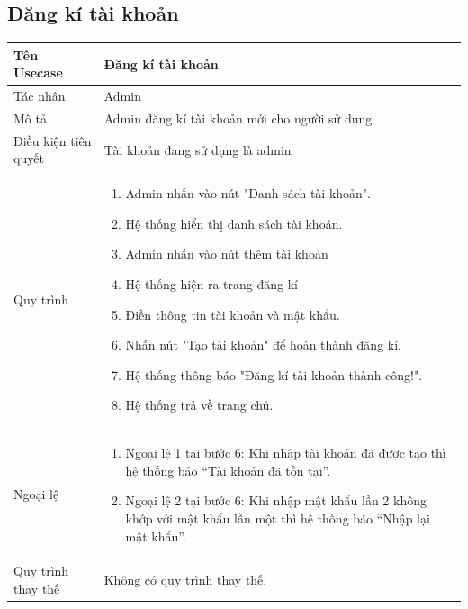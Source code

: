 \subsection{Đăng kí tài khoản }
\begin{center}
	\begin{tabular}{|p{4cm}|p{10cm}|}
		\hline
		Tên Usecase & Đăng kí tài khoản\\ \hline
		Tác nhân & Admin\\ \hline
		Mô tả & Admin đăng kí tài khoản mới cho người sử dụng
		\\ \hline
		Điều kiện tiên quyết & Tài khoản đang sử dụng là admin \\ \hline
		Quy trình & \begin{enumerate}
			\item Admin nhấn vào nút "Danh sách tài khoản".
			\item Hệ thống hiển thị danh sách tài khoản.
			\item Admin nhấn vào nút thêm tài khoản
			\item Hệ thống hiện ra trang đăng kí
			\item Điền thông tin tài khoản và mật khẩu.
			\item Nhấn nút "Tạo tài khoản" để hoàn thành đăng kí.
			\item Hệ thống thông báo "Đăng kí tài khoản thành công!".
			\item Hệ thống trả về trang chủ.
		\end{enumerate}\\ \hline
		Ngoại lệ & \begin{enumerate}
			\item Ngoại lệ 1 tại bước 6: Khi nhập tài khoản đã được tạo thì hệ thống báo “Tài khoản đã tồn tại”.
			\item Ngoại lệ 2 tại bước 6: Khi nhập mật khẩu lần 2 không khớp với mật khẩu lần một thì hệ thống báo “Nhập lại mật khẩu”.
		\end{enumerate} \\ \hline
		Quy trình thay thế &  Không có quy trình thay thế. \\ \hline
		
	\end{tabular}
\end{center}
